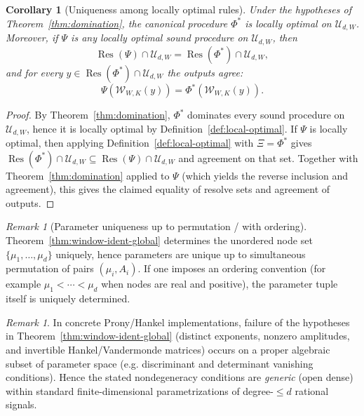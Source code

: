 \documentclass[11pt,reqno]{amsart}
\newtheorem{corollary}[theorem]{Corollary}
\theoremstyle{definition}
\theoremstyle{remark}
\newtheorem{remark}[theorem]{Remark} %
\newcommand{\1}{\mathbf{1}}
\begin{document}
\begin{corollary}[Uniqueness among locally optimal rules]\label{cor:unique-local-optimal}
Under the hypotheses of Theorem~\ref{thm:domination}, the canonical procedure $\Phi^\ast$ is locally optimal on $\mathcal{U}_{d,W}$.
Moreover, if $\Psi$ is any locally optimal sound procedure on $\mathcal{U}_{d,W}$, then
\[
\operatorname{Res}(\Psi)\cap\mathcal{U}_{d,W}=\operatorname{Res}(\Phi^\ast)\cap\mathcal{U}_{d,W},
\]
and for every $y\in \operatorname{Res}(\Phi^\ast)\cap\mathcal{U}_{d,W}$ the outputs agree:
\[
\Psi(\mathcal{W}_{W,K}(y))=\Phi^\ast(\mathcal{W}_{W,K}(y)).
\]
\end{corollary}

\begin{proof}
By Theorem~\ref{thm:domination}, $\Phi^\ast$ dominates every sound procedure on $\mathcal{U}_{d,W}$, hence it is locally optimal by Definition~\ref{def:local-optimal}.
If $\Psi$ is locally optimal, then applying Definition~\ref{def:local-optimal} with $\Xi=\Phi^\ast$ gives
$\operatorname{Res}(\Phi^\ast)\cap\mathcal{U}_{d,W}\subseteq \operatorname{Res}(\Psi)\cap\mathcal{U}_{d,W}$ and agreement on that set.
Together with Theorem~\ref{thm:domination} applied to $\Psi$ (which yields the reverse inclusion and agreement), this gives the claimed equality of resolve sets and agreement of outputs.
\end{proof}



\begin{remark}[Parameter uniqueness up to permutation / with ordering]
Theorem~\ref{thm:window-ident-global} determines the unordered node set
$\{\mu_1,\dots,\mu_d\}$ uniquely, hence parameters are unique up to simultaneous permutation of pairs
$(\mu_i,A_i)$.
If one imposes an ordering convention (for example $\mu_1<\cdots<\mu_d$ when nodes are real and positive),
the parameter tuple itself is uniquely determined.
\end{remark}


\begin{remark}\label{rem:generic-uniqueness}
In concrete Prony/Hankel implementations, failure of the hypotheses in Theorem~\ref{thm:window-ident-global}
(distinct exponents, nonzero amplitudes, and invertible Hankel/Vandermonde matrices) occurs on a proper algebraic subset
of parameter space (e.g. discriminant and determinant vanishing conditions). Hence the stated nondegeneracy conditions
are \emph{generic} (open dense) within standard finite-dimensional parametrizations of degree-$\le d$ rational signals.
\end{remark}
\end{document}
